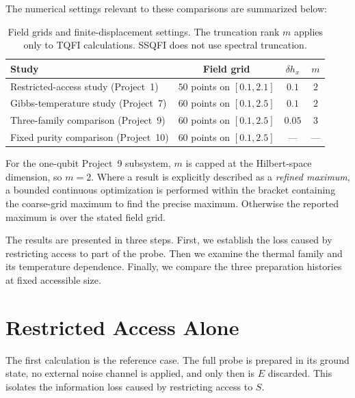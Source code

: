 The numerical settings relevant to these comparisons are summarized below:
\begin{table}[htbp]
    \centering
    \caption{Field grids and finite-displacement settings. The truncation rank $m$ applies only to TQFI calculations. SSQFI does not use spectral truncation.}
    \label{tab:noise_numerical_settings}
    \begin{tabular}{l c c c}
        \toprule
        Study                                & Field grid                 & $\delta h_x$ & $m$ \\
        \midrule
        Restricted-access study (Project~1)  & $50$ points on $[0.1,2.1]$ & $0.1$        & $2$ \\
        Gibbs-temperature study (Project~7)  & $60$ points on $[0.1,2.5]$ & $0.1$        & $2$ \\
        Three-family comparison (Project~9)  & $60$ points on $[0.1,2.5]$ & $0.05$       & $3$ \\
        Fixed purity comparison (Project~10) & $60$ points on $[0.1,2.5]$ & ---          & --- \\
        \bottomrule
    \end{tabular}
\end{table}
For the one-qubit Project~9 subsystem, $m$ is capped at the Hilbert-space dimension, so $m=2$. Where a result is explicitly described as a \emph{refined maximum}, a bounded continuous optimization is performed within the bracket containing the coarse-grid maximum to find the precise maximum. Otherwise the reported maximum is over the stated field grid.

The results are presented in three steps.  First, we establish the loss caused by restricting access to part of the probe.  Then we examine the thermal family and its temperature dependence.  Finally, we compare the three preparation histories at fixed accessible size.
\section{Restricted Access Alone}
\label{sec:project1_noise}

The first calculation is the reference case.  The full probe is prepared in its ground state, no external noise channel is applied, and only then is $E$ discarded.  This isolates the information loss caused by restricting access to $S$.

